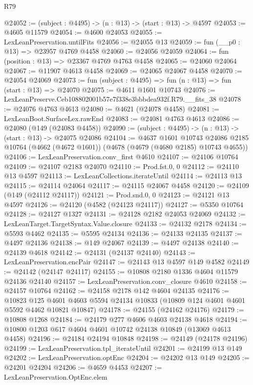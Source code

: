 \begin{lexlean}{R79}
\begin{coremodule}
@24052 := (subject : @4495) -> (n : @13) -> (start : @13) -> @4597
@24053 := @4605 @11579
@24054 := @4600 @24053
@24055 := LexLeanPreservation.untilFits
@24056 := @24055 @13
@24059 := fun (__p0 : @13) => @23957 @4769 @4458
@24060 := @24056 @24059
@24064 := fun (position : @13) => @23367 @4769 @4763 @4458
@24065 := @24060 @24064
@24067 := @11907 @4613 @4458
@24069 := @24065 @24067 @4458
@24070 := @24054 @24069
@24073 := fun (subject : @4495) => fun (n : @13) => fun (start : @13) => @24070
@24075 := @4611 @1601 @10743
@24076 := LexLeanPreserve.Ceb108802001b57e7f338e3bbbdea932f.R79.__fits_38
@24078 := @24076 @4763 @4613
@24080 := @4621 (@24078 @4458)
@24081 := LexLeanBoot.SurfaceLex.rawEnd
@24083 := @24081 @4763 @4613
@24086 := @24080 (@149 (@24083 @4458))
@24090 := (subject : @4495) -> (n : @13) -> (start : @13) -> @24075 @24086
@24104 := @4637
    @1601
    @10743
    @24086
    @2185
    @10764
    (@4662 (@4672 @1601))
    (@4678 (@4679 (@4680 @2185) @10743 @4655))
@24106 := LexLeanPreservation.conv_first @4610
@24107 := @24106 @10764
@24109 := @24107 @2183 @24070
@24110 := Prod.fst.{0, 0}
@24112 := @24110 @13 @4597
@24113 := LexLeanCollections.iterateUntil
@24114 := @24113 @13
@24115 := @24114 @24064
@24117 := @24115 @24067 @4458
@24120 := @24109 (@149 (@24112 @24117))
@24121 := Prod.snd.{0, 0}
@24123 := @24121 @13 @4597
@24126 := @24120 (@4582 (@24123 @24117))
@24127 := @5350 @10764
@24128 := @24127 @1327
@24131 := @24128 @2182 @24053 @24069
@24132 := LexLeanTarget.TargetSyntax.Value.closure
@24133 := @24132 @2178
@24134 := @5593 @4462
@24135 := @5595 @24134
@24136 := @24133 @24135
@24137 := @4497 @24136
@24138 := @149 @24067
@24139 := @4497 @24138
@24140 := @24139 @4618
@24142 := @24131 (@24137 @24140)
@24143 := LexLeanPreservation.encPair
@24147 := @24143 @13 @4597 @149 @4582
@24149 := @24142 (@24147 @24117)
@24155 := @10808 @2180 @1336 @4604 @11579 @24136 @24140
@24157 := LexLeanPreservation.conv_closure @4610
@24158 := @24157 @10764
@24162 := @24158 @2178 @142 @4604 @24135
@24176 := @10823
    @125
    @4601
    @4603
    @5594
    @24134
    @10833
    (@10809 @124 @4601 @4601 @5592 @4462 @10821 @10847)
@24178 := @24155 (@24162 @24176)
@24179 := @10808 @1268
@24184 := @24179 @277 @4606 @4603 @24138 @4618
@24194 := @10800 @1203 @617 @4604 @4601 @10742 @24138 @10849 (@13069 @4613 @4458)
@24196 := @24184 @24194 @10848
@24198 := @24149 (@24178 @24196)
@24199 := LexLeanPreservation.tpl_iterateUntil
@24201 := @24199 @13 @149
@24202 := LexLeanPreservation.optEnc
@24204 := @24202 @13 @149
@24205 := @24201 @24204
@24206 := @4659 @4453
@24207 := LexLeanPreservation.OptEnc.elem

\end{coremodule}
\end{lexlean}
